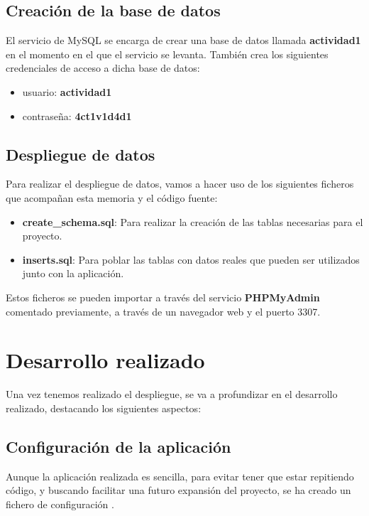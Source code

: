 \documentclass{\ClassPath/viu-tfm-template}
\begin{document}
\section{Creación de la base de datos}

El servicio de MySQL se encarga de crear una base de datos llamada \textbf{actividad1} en el momento en el que el servicio se levanta. También crea los siguientes credenciales de acceso a dicha base de datos:

\vspace{-1em}
\begin{itemize}
    \item usuario:  \textbf{actividad1}
    \item contraseña:  \textbf{4ct1v1d4d1}
\end{itemize}
\vspace{-1em}

\section{Despliegue de datos}
Para realizar el despliegue de datos, vamos a hacer uso de los siguientes ficheros que acompañan esta memoria y el código fuente:

\vspace{-1em}
\begin{itemize}
    \item \textbf{create\_schema.sql}: Para realizar la creación de las tablas necesarias para el proyecto.
    \item \textbf{inserts.sql}: Para poblar las tablas con datos reales que pueden ser utilizados junto con la aplicación.
\end{itemize}
\vspace{-1em}

Estos ficheros se pueden importar a través del servicio \textbf{PHPMyAdmin} comentado previamente, a través de un navegador web y el puerto 3307.


\chapter{Desarrollo realizado}

Una vez tenemos realizado el despliegue, se va a profundizar en el desarrollo realizado, destacando los siguientes aspectos:

\section{Configuración de la aplicación}
Aunque la aplicación realizada es sencilla, para evitar tener que estar repitiendo código, y buscando facilitar una futuro expansión del proyecto, se ha creado un fichero de configuración .
\end{document}
